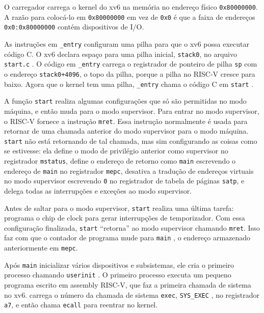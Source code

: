 O carregador carrega o kernel do xv6 na memória no endereço físico
\texttt{0x80000000}.
A razão para colocá-lo em
\texttt{0x80000000}
em vez de
\texttt{0x0}
é que a faixa de endereços
\texttt{0x0:0x80000000}
contém dispositivos de I/O.

As instruções em
\lstinline{_entry}
configuram uma pilha para que o xv6 possa executar código C.
O xv6 declara espaço para uma pilha inicial,
\lstinline{stack0},
no arquivo
\lstinline{start.c}
.
O código em
\lstinline{_entry}
carrega o registrador de ponteiro de pilha
\texttt{sp}
com o endereço
\lstinline{stack0+4096},
o topo da pilha, porque a pilha no RISC-V cresce para baixo.
Agora que o kernel tem uma pilha,
\lstinline{_entry}
chama o código C em
\lstinline{start}
.

A função
\lstinline{start}
realiza algumas configurações que só são permitidas no modo máquina, e então muda para o modo supervisor.
Para entrar no modo supervisor, o RISC-V fornece a instrução
\lstinline{mret}.
Essa instrução normalmente é usada para retornar de uma chamada anterior do modo supervisor para o modo máquina.
\lstinline{start} não está retornando de tal chamada, mas sim configurando as coisas como se estivesse:
ela define o modo de privilégio anterior como supervisor no registrador
\lstinline{mstatus},
define o endereço de retorno como
\lstinline{main}
escrevendo o endereço de
\lstinline{main}
no registrador
\lstinline{mepc},
desativa a tradução de endereços virtuais no modo supervisor escrevendo
\lstinline{0}
no registrador de tabela de páginas
\lstinline{satp},
e delega todas as interrupções e exceções ao modo supervisor.

Antes de saltar para o modo supervisor,
\lstinline{start}
realiza uma última tarefa: programa o chip de clock para gerar interrupções de temporizador.
Com essa configuração finalizada,
\lstinline{start}
“retorna” ao modo supervisor chamando
\lstinline{mret}.
Isso faz com que o contador de programa mude para
\lstinline{main}
,
o endereço armazenado anteriormente em \lstinline{mepc}.

Após
\lstinline{main}
inicializar vários dispositivos e subsistemas, ele cria o primeiro processo chamando
\lstinline{userinit}
.
O primeiro processo executa um pequeno programa escrito em assembly RISC-V, que faz a primeira chamada de sistema no xv6.
carrega o número da chamada de sistema \lstinline{exec},
\lstinline{SYS_EXEC}
,
no registrador {\tt a7}, e então chama \lstinline{ecall} para reentrar no kernel.


